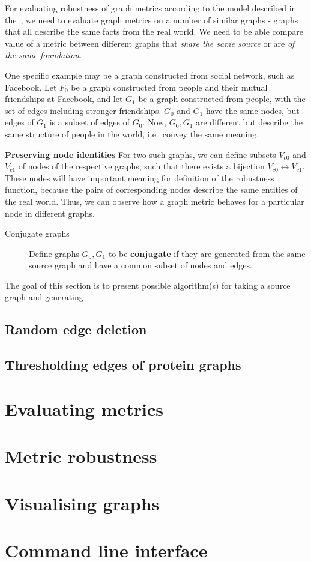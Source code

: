 For evaluating robustness of graph metrics according to the model described in the~, we need to evaluate graph metrics on a number of similar graphs - graphs that all describe the same facts from the real world.
We need to be able compare value of a metric between different graphs that \textit{share the same source} or are \textit{of the same foundation}.

One specific example may be a graph constructed from social network, such as Facebook.
Let $F_0$ be a graph constructed from people and their mutual friendships at Facebook, and let $G_1$ be a graph constructed from people, with the set of edges including stronger friendships. $G_0$ and $G_1$ have the same nodes, but edges of $G_1$ is a subset of edges of $G_0$.
Now, $G_0, G_1$ are different but describe the same structure of people in the world, i.e.\ convey the same meaning.

\textbf{Preserving node identities} For two such graphs, we can define subsets $V_{c0}$ and $V_{c1}$ of nodes of the respective graphs, such that there exists a bijection $V_{c0} \leftrightarrow V_{c1}$.
These nodes will have important meaning for definition of the robustness function, because the pairs of corresponding nodes describe the same entities of the real world.
Thus, we can observe how a graph metric behaves for a particular node in different graphs.

\begin{description}
    \item[Conjugate graphs] Define graphs $G_0, G_1$ to be \textbf{conjugate} if they are generated from the same source graph and have a common subset of nodes and edges.
\end{description}

The goal of this section is to present possible algorithm(s) for taking a source graph and generating

\subsection{Random edge deletion}

\subsection{Thresholding edges of protein graphs}


\section{Evaluating metrics}


\section{Metric robustness}


\section{Visualising graphs}


\section{Command line interface}

